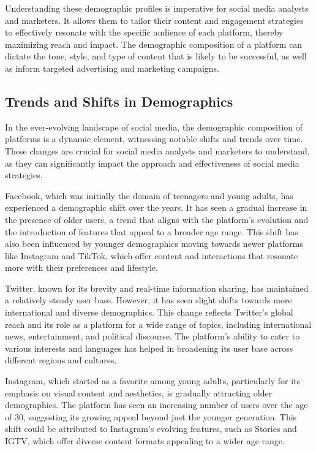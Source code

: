 \documentclass[
]{book}
\begin{document}
Understanding these demographic profiles is imperative for social media analysts and marketers. It allows them to tailor their content and engagement strategies to effectively resonate with the specific audience of each platform, thereby maximizing reach and impact. The demographic composition of a platform can dictate the tone, style, and type of content that is likely to be successful, as well as inform targeted advertising and marketing campaigns.

\hypertarget{trends-and-shifts-in-demographics}{%
\subsection*{Trends and Shifts in Demographics}\label{trends-and-shifts-in-demographics}}

In the ever-evolving landscape of social media, the demographic composition of platforms is a dynamic element, witnessing notable shifts and trends over time. These changes are crucial for social media analysts and marketers to understand, as they can significantly impact the approach and effectiveness of social media strategies.

Facebook, which was initially the domain of teenagers and young adults, has experienced a demographic shift over the years. It has seen a gradual increase in the presence of older users, a trend that aligns with the platform's evolution and the introduction of features that appeal to a broader age range. This shift has also been influenced by younger demographics moving towards newer platforms like Instagram and TikTok, which offer content and interactions that resonate more with their preferences and lifestyle.

Twitter, known for its brevity and real-time information sharing, has maintained a relatively steady user base. However, it has seen slight shifts towards more international and diverse demographics. This change reflects Twitter's global reach and its role as a platform for a wide range of topics, including international news, entertainment, and political discourse. The platform's ability to cater to various interests and languages has helped in broadening its user base across different regions and cultures.

Instagram, which started as a favorite among young adults, particularly for its emphasis on visual content and aesthetics, is gradually attracting older demographics. The platform has seen an increasing number of users over the age of 30, suggesting its growing appeal beyond just the younger generation. This shift could be attributed to Instagram's evolving features, such as Stories and IGTV, which offer diverse content formats appealing to a wider age range.
\end{document}

